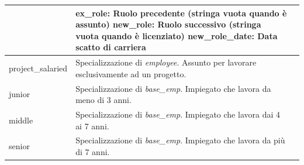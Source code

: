 \begin{longtable}{@{}| p{} | p{} | p{} |}
\begin{minipage}[t]{0.4\textwidth}
	                       \end{minipage}
	                     & \begin{minipage}[t]{0.3\textwidth}
		                       \raggedright
		                       \textbf{ex\_role}: Ruolo precedente (stringa vuota quando è assunto)\sskip
		                       \textbf{new\_role}: Ruolo successivo (stringa vuota quando è licenziato)\sskip
		                       \textbf{new\_role\_date}: Data scatto di carriera
	                       \end{minipage}                                      \\[90pt]
	\hline
	project\_salaried    & \begin{minipage}[t]{0.4\textwidth}
		                       \raggedright
		                       Specializzazione di \textit{employee}. Assunto per lavorare esclusivamente ad un progetto.
	                       \end{minipage}
	                     &                                                                                                                    \\[25pt]
	\hline
	junior               & \begin{minipage}[t]{0.4\textwidth}
		                       \raggedright
		                       Specializzazione di \textit{base\_emp}. Impiegato che lavora da meno di 3 anni.
	                       \end{minipage}
	                     &                                                                                                                    \\[25pt]
	\hline
	middle               & \begin{minipage}[t]{0.4\textwidth}
		                       \raggedright
		                       Specializzazione di \textit{base\_emp}. Impiegato che lavora dai 4 ai 7 anni.
	                       \end{minipage}
	                     &                                                                                                                    \\[15pt]
	\hline
	senior               & \begin{minipage}[t]{0.4\textwidth}
		                       \raggedright
		                       Specializzazione di \textit{base\_emp}. Impiegato che lavora da più di 7 anni.
	                       \end{minipage}
	                     &                                                                                                                    \\[15pt]

\end{longtable}
